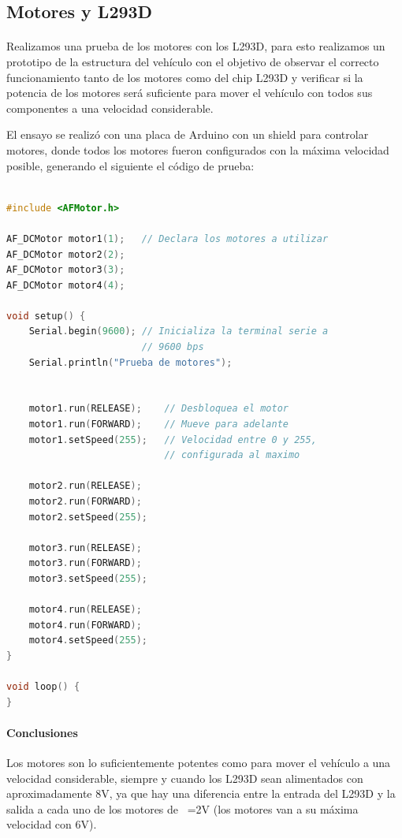 \subsection{Motores y L293D}

\paragraph{}Realizamos una prueba de los motores con los L293D, para esto realizamos un prototipo de la estructura del vehículo con el objetivo de observar el correcto funcionamiento tanto de los motores como del chip L293D y verificar si la potencia de los motores será suficiente para mover el vehículo con todos sus componentes a una velocidad considerable. 

El ensayo se realizó con una placa de Arduino con un shield para controlar motores, donde todos los motores fueron configurados con la máxima velocidad posible, generando el siguiente el código de prueba:

\begin{lstlisting}[language=C,basicstyle=\footnotesize\ttfamily]

#include <AFMotor.h>

AF_DCMotor motor1(1);	// Declara los motores a utilizar
AF_DCMotor motor2(2);
AF_DCMotor motor3(3);
AF_DCMotor motor4(4);

void setup() {
	Serial.begin(9600);	// Inicializa la terminal serie a 
						// 9600 bps
	Serial.println("Prueba de motores");


	motor1.run(RELEASE);	// Desbloquea el motor
	motor1.run(FORWARD);    // Mueve para adelante
	motor1.setSpeed(255);   // Velocidad entre 0 y 255,
                            // configurada al maximo
	
	motor2.run(RELEASE);
	motor2.run(FORWARD);
	motor2.setSpeed(255);
	
	motor3.run(RELEASE);
	motor3.run(FORWARD);
	motor3.setSpeed(255);
	
	motor4.run(RELEASE);
	motor4.run(FORWARD);
	motor4.setSpeed(255);
}

void loop() {
}
\end{lstlisting}

\paragraph{Conclusiones} Los motores son lo suficientemente potentes como para mover el vehículo a una velocidad considerable, siempre y cuando los L293D sean alimentados con aproximadamente 8V, ya que hay una diferencia entre la entrada del L293D y la salida a cada uno de los motores de ~=2V (los motores van a su máxima velocidad con 6V).

